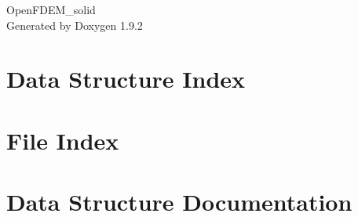 \documentclass[twoside]{book}
\newcommand{\+}{\discretionary{\mbox{\scriptsize$\hookleftarrow$}}{}{}}
\newcommand{\clearemptydoublepage}{%
    \newpage{\pagestyle{empty}\cleardoublepage}%
  }
\begin{document}
  \raggedbottom
    \hypersetup{pageanchor=false,
                bookmarksnumbered=true,
                pdfencoding=unicode
               }
  \begin{titlepage}
  \vspace*{7cm}
  \begin{center}%
  {\Large Open\+FDEM\+\_\+solid}\\
  \vspace*{1cm}
  {\large Generated by Doxygen 1.9.2}\\
  \end{center}
  \end{titlepage}
  \clearemptydoublepage
  \tableofcontents
  \clearemptydoublepage
  \hypersetup{pageanchor=true}
\chapter{Data Structure Index}

\chapter{File Index}

\chapter{Data Structure Documentation}







































\end{document}
